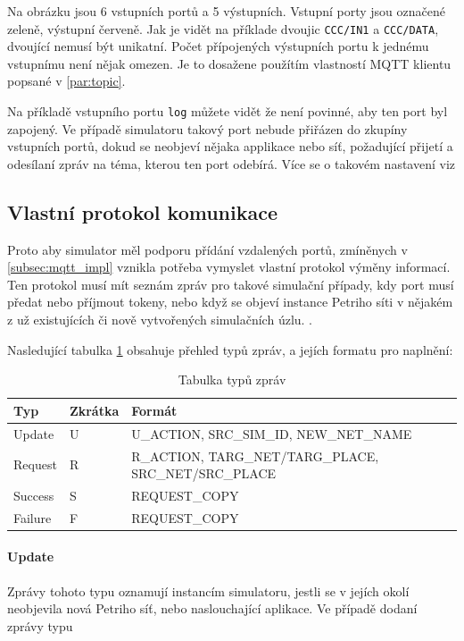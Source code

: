 Na obrázku jsou 6 vstupních portů a 5 výstupních. Vstupní porty jsou označené zeleně, výstupní červeně. Jak je vidět na příklade dvoujic \texttt{CCC/IN1} a \texttt{CCC/DATA}, dvoující nemusí být unikatní. Počet přípojených výstupních portu k jednému vstupnímu není nějak omezen. Je to dosažene použítím vlastností MQTT klientu popsané v \ref{par:topic}.

Na příkladě vstupního portu \texttt{log} můžete vidět že není povinné, aby ten port byl zapojený. Ve případě simulatoru takový port nebude přiřázen do zkupíny vstupních portů, dokud se neobjeví nějaka applikace nebo síť, požadující přijetí a odesílaní zpráv na téma, kterou ten port odebírá. Více se o takovém nastavení viz 

\subsection{Vlastní protokol komunikace}
Proto aby simulator měl podporu přídání vzdalených portů, zmíněnych v \ref{subsec:mqtt_impl} vznikla potřeba vymyslet vlastní protokol výměny informací. Ten protokol musí mít seznám zpráv pro takové simulační případy, kdy port musí předat nebo příjmout tokeny, nebo když se objeví instance Petriho síti v nějakém z už existujících či nově vytvořených simulačních úzlu. .

Nasledující tabulka \ref{tab:mqtt-msg-types} obsahuje přehled typů zpráv, a jejích formatu pro naplnění:

\begin{table}[H]
	\vskip6pt
	\caption{Tabulka typů zpráv}
    \vskip6pt
	\centering
	\begin{tabular}{llllr}
		\toprule
		Typ & Zkrátka & Formát \\
    \midrule
    Update & U & U\_ACTION, SRC\_SIM\_ID, NEW\_NET\_NAME \\
    Request & R & R\_ACTION, TARG\_NET/TARG\_PLACE, SRC\_NET/SRC\_PLACE \\
    Success & S & REQUEST\_COPY \\
    Failure & F & REQUEST\_COPY \\
		\bottomrule
	\end{tabular}
	\label{tab:mqtt-msg-types}
\end{table}

\paragraph{Update} Zprávy tohoto typu oznamují instancím simulatoru, jestli se v jejích okolí neobjevila nová Petriho síť, nebo naslouchající aplikace. Ve případě dodaní zprávy typu  \todo{}

